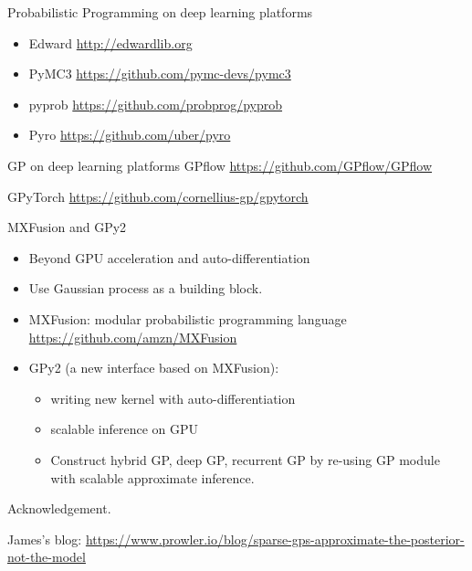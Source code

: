 \documentclass[14pt,aspectratio=1610]{beamer}
\begin{document}
\begin{frame}{Probabilistic Programming on deep learning platforms}

\begin{itemize}
\item Edward \url{http://edwardlib.org}
\item PyMC3 \url{https://github.com/pymc-devs/pymc3}
\item pyprob \url{https://github.com/probprog/pyprob}
\item Pyro \url{https://github.com/uber/pyro}
\end{itemize}

\end{frame}

\begin{frame}{GP on deep learning platforms}
GPflow \url{https://github.com/GPflow/GPflow}

GPyTorch \url{https://github.com/cornellius-gp/gpytorch}
\end{frame}



\begin{frame}{MXFusion and GPy2}
\begin{itemize}
\item Beyond GPU acceleration and auto-differentiation
\item Use Gaussian process as a building block.
\item MXFusion: modular probabilistic programming language \\
\url{https://github.com/amzn/MXFusion}
\item GPy2 (a new interface based on MXFusion): 
\begin{itemize}
\item writing new kernel with auto-differentiation
\item scalable inference on GPU
\item Construct hybrid GP, deep GP, recurrent GP by re-using GP module with scalable approximate inference.
\end{itemize}
\end{itemize}
\end{frame}

\begin{frame}{}

Acknowledgement. 

James's blog: \url{https://www.prowler.io/blog/sparse-gps-approximate-the-posterior-not-the-model}
\end{frame}


{\footnotesize

}
%
\end{document}
